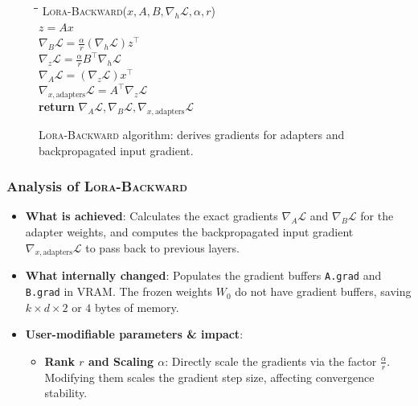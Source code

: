 \documentclass{article}
\begin{document}
\begin{figure}[h]
\centering
\begin{minipage}{0.8\linewidth}
\begin{tabbing}
\quad \= \quad \= \quad \= \kill
\textsc{Lora-Backward}($x, A, B, \nabla_h \mathcal{L}, \alpha, r$) \\
\> $z = A x$ \\
\> $\nabla_B \mathcal{L} = \frac{\alpha}{r} (\nabla_h \mathcal{L}) z^\top$ \\
\> $\nabla_z \mathcal{L} = \frac{\alpha}{r} B^\top \nabla_h \mathcal{L}$ \\
\> $\nabla_A \mathcal{L} = (\nabla_z \mathcal{L}) x^\top$ \\
\> $\nabla_{x,\text{adapters}} \mathcal{L} = A^\top \nabla_z \mathcal{L}$ \\
\> \textbf{return} $\nabla_A \mathcal{L}, \nabla_B \mathcal{L}, \nabla_{x,\text{adapters}} \mathcal{L}$
\end{tabbing}
\end{minipage}
\caption{\textsc{Lora-Backward} algorithm: derives gradients for adapters and backpropagated input gradient.}
\end{figure}

\subsubsection{Analysis of \textsc{Lora-Backward}}
\begin{itemize}
  \item \textbf{What is achieved}: Calculates the exact gradients $\nabla_A \mathcal{L}$ and $\nabla_B \mathcal{L}$ for the adapter weights, and computes the backpropagated input gradient $\nabla_{x,\text{adapters}} \mathcal{L}$ to pass back to previous layers.
  \item \textbf{What internally changed}: Populates the gradient buffers \texttt{A.grad} and \texttt{B.grad} in VRAM. The frozen weights $W_0$ do not have gradient buffers, saving $k \times d \times 2$ or $4$ bytes of memory.
  \item \textbf{User-modifiable parameters \& impact}:
    \begin{itemize}
      \item \textbf{Rank $r$ and Scaling $\alpha$}: Directly scale the gradients via the factor $\frac{\alpha}{r}$. Modifying them scales the gradient step size, affecting convergence stability.
    \end{itemize}
\end{itemize}
\end{document}

